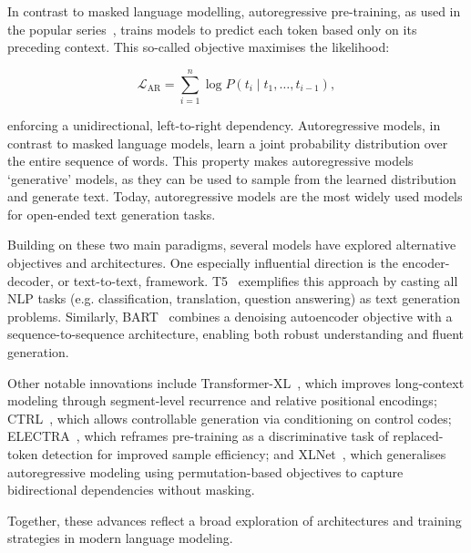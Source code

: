In contrast to masked language modelling, autoregressive pre-training, as used in the popular  series~\citep{radford2018gpt1, radford2019gpt2, brown2020gpt3}, trains models to predict each token based only on its preceding context. This so-called  objective maximises the likelihood:

\begin{equation}
\mathcal{L}_{\text{AR}} = \sum_{i=1}^n \log P(t_i \mid t_1, \ldots, t_{i-1}),
\label{eq:ar-loss}
\end{equation}

enforcing a unidirectional, left-to-right dependency. Autoregressive models, in contrast to masked language models, learn a joint probability distribution over the entire sequence of words. This property makes autoregressive models `generative' models, as they can be used to sample from the learned distribution and generate text. Today, autoregressive models are the most widely used models for open-ended text generation tasks.

Building on these two main paradigms, several models have explored alternative objectives and architectures. One especially influential direction is the encoder-decoder, or text-to-text, framework. T5~\citep{raffel2020t5} exemplifies this approach by casting all NLP tasks (e.g. classification, translation, question answering) as text generation problems. Similarly, BART~\citep{lewis2020bart} combines a denoising autoencoder objective with a sequence-to-sequence architecture, enabling both robust understanding and fluent generation.

Other notable innovations include Transformer-XL~\citep{dai2019transformer}, which improves long-context modeling through segment-level recurrence and relative positional encodings; CTRL~\citep{keskar2019ctrl}, which allows controllable generation via conditioning on control codes; ELECTRA~\citep{clark2020electra}, which reframes pre-training as a discriminative task of replaced-token detection for improved sample efficiency; and XLNet~\citep{yang2019xlnet}, which generalises autoregressive modeling using permutation-based objectives to capture bidirectional dependencies without masking.

Together, these advances reflect a broad exploration of architectures and training strategies in modern language modeling.

